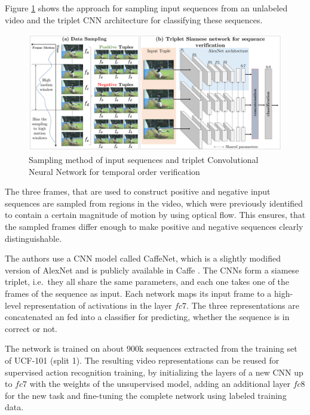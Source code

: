 Figure \ref{fig:shufflelearn_approach} shows the approach for sampling input sequences from an unlabeled video and the triplet CNN architecture for classifying these sequences.

\begin{figure}[H]
    \centering
    \includegraphics[width=\textwidth]{img_deep/shufflelearn_approach}
    \caption{Sampling method of input sequences and triplet Convolutional Neural Network for temporal order verification \cite{misra_shuffle_2016}}
    \label{fig:shufflelearn_approach}
\end{figure}

The three frames, that are used to construct positive and negative input sequences are sampled from regions in the video, which were previously identified to contain a certain magnitude of motion by using optical flow.
This ensures, that the sampled frames differ enough to make positive and negative sequences clearly distinguishable.

The authors use a CNN model called CaffeNet, which is a slightly modified version of AlexNet \cite{krizhevsky_imagenet_2012-1} and is publicly available in Caffe \cite{jia_caffe:_2014}. 
The CNNs form a siamese triplet, i.e.\ they all share the same parameters, and each one takes one of the frames of the sequence as input.
Each network maps its input frame to a high-level representation of activations in the layer $fc7$.
The three representations are concatenated an fed into a classifier for predicting, whether the sequence is in correct or not.

The network is trained on about $900$k sequences extracted from the training set of UCF-101 (split 1).
The resulting video representations can be reused for supervised action recognition training, by initializing the layers of a new CNN up to $fc7$ with the weights of the unsupervised model, adding an additional layer $fc8$ for the new task and fine-tuning the complete network using labeled training data.

